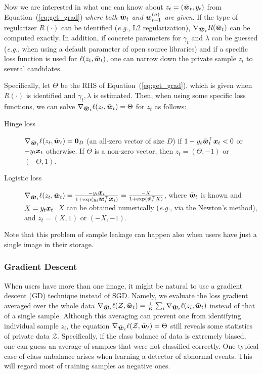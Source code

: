 \documentclass[10pt,twocolumn,letterpaper]{article}
\def\vct#1{\mbox{\boldmath $#1$}}
\def\eg{{\it e.g.}}
\def\ui#1{^{(#1)}}
\def\barw{\bar{\vct{w}}}
\def\wui{\vct{w}\ui{n}}
\begin{document}
Now we are interested in what one can know about $z_t = (\barw_t, y_t)$ from Equation~(\ref{eq:get_grad}) \emph{where both $\barw_t$ and $\wui_{t+1}$ are given}. If the type of regularizer $R(\cdot)$ can be identified (\eg, L2 regularization), $\nabla_{\barw_t}R(\barw_t)$ can be computed exactly. In addition, if concrete parameters for $\gamma_t$ and $\lambda$ can be guessed (\eg, when using a default parameter of open source libraries) and if a specific loss function is used for $\ell(z_t, \barw_t)$, one can narrow down the private sample $z_t$ to several candidates.

Specifically, let $\Theta$ be the RHS of Equation~(\ref{eq:get_grad}), which is given when $R(\cdot)$ is identified and $\gamma_t, \lambda$ is estimated. Then, when using some specific loss functions, we can solve $\nabla_{\barw_t}\ell(z_t, \barw_t)=\Theta$ for $z_t$ as follows: 
\begin{description}
\item[Hinge loss] $\nabla_{\barw_t}\ell(z_t, \barw_t) = \vct{0}_D$ (an all-zero vector of size $D$) if $1-y_t\barw_t^\top\vct{x}_t < 0$ or $-y_t\vct{x}_t$ otherwise. If $\Theta$ is a non-zero vector, then $z_t=(\Theta, -1)$ or $(-\Theta, 1)$.
\item[Logistic loss] $\nabla_{\barw_t}\ell(z_t, \barw_t) = \frac{-y_t\vct{x}_t}{1 + \exp(y_t\barw_t^\top\vct{x}_t)}=\frac{-X}{1+\exp(\bar{w}_t^\top X)}$, where $\barw_t$ is known and $X=y_t\vct{x}_t$. $X$ can be obtained numerically (\eg, via the Newton's method), and $z_t=(X, 1)$ or $(-X, -1)$.
\end{description}

Note that this problem of sample leakage can happen also when users have just a single image in their storage. 

\subsubsection{Gradient Descent}
When users have more than one image, it might be natural to use a gradient descent (GD) technique instead of SGD. Namely, we evaluate the loss gradient averaged over the whole data $\nabla_{\barw_t}\ell(\mathcal{Z}, \barw_t)=\frac{1}{K}\sum_i\nabla_{\barw_t}\ell(z_i, \barw_t)$ instead of that of a single sample. Although this averaging can prevent one from identifying individual sample $z_i$, the equation $\nabla_{\barw_t}\ell(\mathcal{Z}, \barw_t)=\Theta$ still reveals some statistics of private data $\mathcal{Z}$. Specifically, if the class balance of data is extremely biased, one can guess an average of samples that were not classified correctly. One typical case of class unbalance arises when learning a detector of abnormal events. This will regard most of training samples as negative ones.
\end{document}
